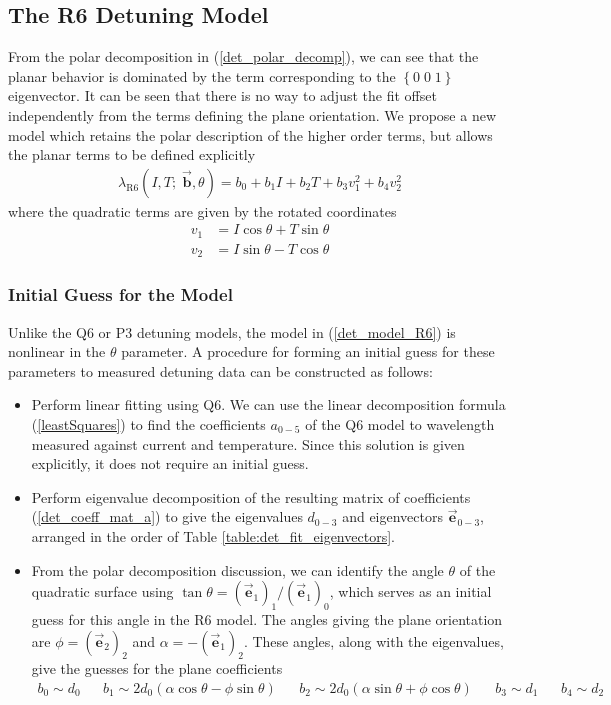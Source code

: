 \documentclass[12pt]{report}
\begin{document}
	
	\subsection{The R6 Detuning Model} \label{sec:det_R6}
	
	From the polar decomposition in (\ref{det_polar_decomp}), we can see that the planar behavior is dominated by the term corresponding to the $\left\{0\;0\;1\right\}$ eigenvector. It can be seen that there is no way to adjust the fit offset independently from the terms defining the plane orientation. We propose a new model which retains the polar description of the higher order terms, but allows the planar terms to be defined explicitly
	\begin{align} \label{det_model_R6}
		\lambda_\mathrm{R6}(I, T;\; \vec{\textbf{b}},\theta) = b_0 + b_1 I + b_2 T + b_3 v_1^2 + b_4 v_2^2
	\end{align}
	where the quadratic terms are given by the rotated coordinates
	\begin{align}
		v_1 &= I\cos\theta + T\sin\theta \nonumber\\
		v_2 &= I\sin\theta - T\cos\theta
	\end{align}
	
	\subsubsection{Initial Guess for the Model}
	Unlike the Q6 or P3 detuning models, the model in (\ref{det_model_R6}) is nonlinear in the $\theta$ parameter. A procedure for forming an initial guess for these parameters to measured detuning data can be constructed as follows:
	\begin{itemize}
		\item Perform linear fitting using Q6. We can use the linear decomposition formula (\ref{leastSquares}) to find the coefficients $a_{0-5}$ of the Q6 model to wavelength measured against current and temperature. Since this solution is given explicitly, it does not require an initial guess.
		\item Perform eigenvalue decomposition of the resulting matrix of coefficients (\ref{det_coeff_mat_a}) to give the eigenvalues $d_{0-3}$ and eigenvectors $\vec{\textbf{e}}_{0-3}$, arranged in the order of Table \ref{table:det_fit_eigenvectors}.
		\item From the polar decomposition discussion, we can identify the angle $\theta$ of the quadratic surface using $\tan\theta = (\vec{\textbf{e}}_1)_1 / (\vec{\textbf{e}}_1)_0$, which serves as an initial guess for this angle in the R6 model. The angles giving the plane orientation are $\phi = (\vec{\textbf{e}}_2)_2$ and $\alpha = -(\vec{\textbf{e}}_1)_2$. These angles, along with the eigenvalues, give the guesses for the plane coefficients
		\begin{align}
			b_0 \sim d_0 && b_1 \sim 2d_0\left(\alpha \cos\theta - \phi \sin \theta\right) && b_2 \sim 2d_0 \left(\alpha \sin\theta + \phi \cos\theta\right) && b_3 \sim d_1 && b_4 \sim d_2
		\end{align}
	\end{itemize}
	
\end{document}
